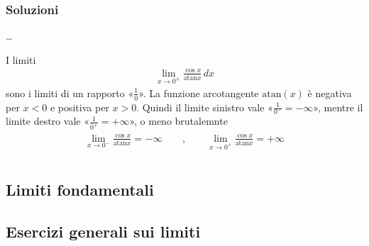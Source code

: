 \documentclass[letterpaper,10pt,italian]{jupyterBook}
\begin{document}
\subsubsection*{Soluzioni}

\sphinxAtStartPar
{}

\sphinxAtStartPar
…

\sphinxAtStartPar
{} I limiti
\begin{equation*}
\begin{split}\lim_{x \to 0^\mp} \frac{\cos x}{\text{atan} x} \, dx\end{split}
\end{equation*}
\sphinxAtStartPar
sono i limiti di un rapporto «\(\frac{1}{0}\)». La funzione arcotangente \(\text{atan}(x)\) è negativa per \(x < 0\) e positiva per \(x > 0\). Quindi il limite sinistro vale «\(\frac{1}{0^-} = - \infty\)», mentre il limite destro vale «\(\frac{1}{0^+} = + \infty\)», o meno brutalemnte
\begin{equation*}
\begin{split}\begin{aligned}
  \lim_{x \to 0^-} \frac{\cos x}{\text{atan} x} = -\infty \qquad , \qquad
  \lim_{x \to 0^+} \frac{\cos x}{\text{atan} x} = +\infty \\
\end{aligned}\end{split}
\end{equation*}



\subsection{Limiti fondamentali}
\label{\detokenize{ch/infinitesimal_calculus/analysis-problems:limiti-fondamentali}}\label{\detokenize{ch/infinitesimal_calculus/analysis-problems:infinitesimal-calculus-analysis-problems-fundamental-limits}}

\subsection{Esercizi generali sui limiti}
\label{\detokenize{ch/infinitesimal_calculus/analysis-problems:esercizi-generali-sui-limiti}} \label{exercise:ch/infinitesimal_calculus/analysis-problems-exercise-4}
\end{document}
